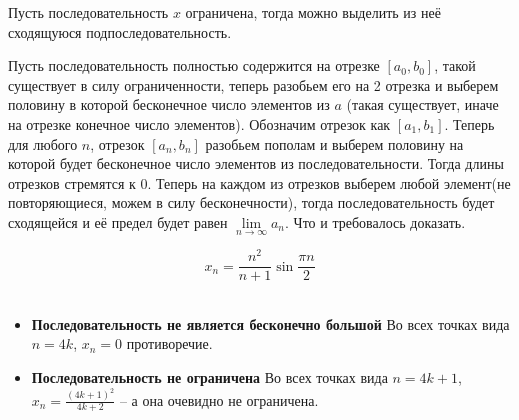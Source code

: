 \begin{theorem}
	Пусть последовательность $x$ ограничена, тогда можно выделить из неё сходящуюся подпоследовательность.
\end{theorem}

\begin{Proof}
    Пусть последовательность полностью содержится на отрезке $[a_0, b_0]$, такой существует в силу ограниченности, теперь разобьем его на 2 отрезка и выберем половину в которой бесконечное число элементов из $a$ (такая существует, иначе на отрезке конечное число элементов). Обозначим отрезок как $[a_1, b_1]$. Теперь для любого $n$, отрезок $[a_n, b_n]$ разобьем пополам и выберем половину на которой будет бесконечное число элементов из последовательности. Тогда длины отрезков стремятся к 0. Теперь на каждом из отрезков выберем любой элемент(не повторяющиеся, можем в силу бесконечности), тогда последовательность будет сходящейся и её предел будет равен $\lim\limits_{n \rightarrow \infty} a_n$. Что и требовалось доказать.
\end{Proof}

\begin{task}
\[x_n = \frac{n^2}{n + 1} \sin{\frac{\pi n}{2}}\]
\\
    \begin{itemize}
        \item \textbf{Последовательность не является бесконечно большой} Во всех точках вида $n = 4 k$, $x_n = 0$ противоречие.

        \item \textbf{Последовательность не ограничена}  Во всех точках вида  $n = 4 k + 1$, $x_n = \frac{(4 k + 1)^2}{4 k + 2}$ -- а она очевидно не ограничена.
    \end{itemize}
\end{task}

